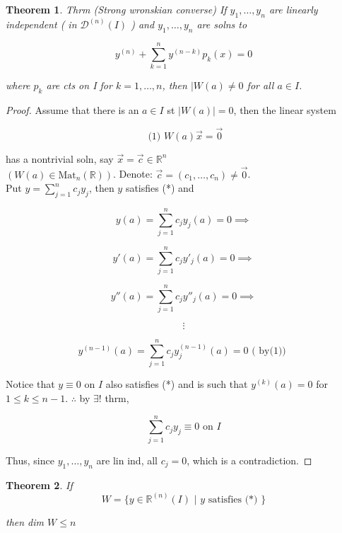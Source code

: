 \documentclass{article}
\newtheorem*{theorem}{Theorem}
\theoremstyle{definition}
\begin{document}
\begin{theorem}
  Thrm (Strong wronskian converse) If \( y_1, \dots , y_n \) are linearly
  independent ( in \( \mathscr{D}^{(n)} (I) \) ) and \( y_1, \dots , y_n
  \) are solns to 

  \hrulefill

  \[ y^{(n)} + \sum_{k=1}^n y^{(n-k)} p_k(x) = 0 \]

  where \( p_k \) are cts on I for \( k=1, \dots , n \), then \( |W(a)
  \neq 0  \) for all \( a \in I \). 
\end{theorem}

\begin{proof}
  Assume that there is an \( a \in I \) st \( |W(a)| = 0 \), then
  the linear system 

  \[ \text{ (1) } W(a) \vec{x} = \vec{0} \]

  has a nontrivial soln, say \( \vec{x} = \vec{c} \in \mathbb{R}^n \)\\
  \( (W(a) \in \text{Mat}_n( \mathbb{R})) \). Denote: \( \vec{c} = (c_1,
  \dots , c_n) \neq \vec{0} \). \\[5mm]

  Put \( y = \sum_{j=1}^n c_j y_j \), then \( y \) satisfies (*) and %

  \[  y(a) = \sum_{j=1}^n c_j y_j(a) = 0  \implies\]

  \[ y'(a) = \sum_{j=1}^n c_j y'_j(a) = 0 \implies\]

  \[  y''(a) = \sum_{j=1}^n c_j y''_j(a) = 0  \implies\]

  \[ \vdots \]

  \[  y^{(n-1)}(a) = \sum_{j=1}^n c_j y^{(n-1)}_j(a) = 0 \text{ ( by(1)) } \]

  Notice that \( y \equiv 0 \) on \( I  \) also satisfies (*) and is such
  that \( y^{(k)}(a) = 0 \) for \( 1 \leq k \leq n-1 \). \( \therefore \)
  by \( \exists \)! thrm, 

  \[ \sum_{j=1}^n c_j y_j \equiv 0 \text{ on } I \]

  Thus, since \( y_1, \dots , y_n \) are lin ind, all \( c_j = 0 \), which
  is a contradiction.  
\end{proof}

\begin{theorem}
  If
  \[ W = \{ y \in \mathbb{R}^{(n)}(I) \text{ | } y \text{ satisfies (*) }  \}
  \]

  then dim \( W \leq n  \)
\end{theorem}
\end{document}
